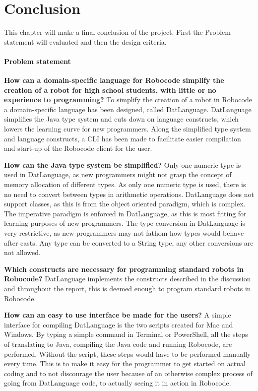 \chapter{Conclusion}
\label{chap:Conclusion}
This chapter will make a final conclusion of the project. First the Problem statement will evaluated and then the design criteria.

\subsubsection{Problem statement}
\textbf{How can a domain-specific language for Robocode simplify the creation of a robot for high school students, with little or no experience to programming?} \newline
To simplify the creation of a robot in Robocode a domain-specific language has been designed, called DatLanguage. DatLanguage simplifies the Java type system and cuts down on language constructs, which lowers the learning curve for new programmers. Along the simplified type system and language constructs, a CLI has been made to facilitate easier compilation and start-up of the Robocode client for the user.

\textbf{How can the Java type system be simplified?} \newline
Only one numeric type is used in DatLanguage, as new programmers might not grasp the concept of memory allocation of different types. As only one numeric type is used, there is no need to convert between types in arithmetic operations. DatLanguage does not support classes, as this is from the object oriented paradigm, which is complex. The imperative paradigm is enforced in DatLanguage, as this is most fitting for learning purposes of new programmers. The type conversion in DatLanguage is very restrictive, as new programmers may not fathom how types would behave after casts. Any type can be converted to a String type, any other conversions are not allowed. 

\textbf{Which constructs are necessary for programming standard robots in Robocode?} \newline
DatLanguage implements the constructs described in the discussion and throughout the report, this is deemed enough to program standard robots in Robocode. 

\textbf{How can an easy to use interface be made for the users?} \newline
A simple interface for compiling DatLanguage is the two scripts created for Mac and Windows. By typing a simple command in Terminal or PowerShell, all the steps of translating to Java, compiling the Java code and running Robocode, are performed. 
Without the script, these steps would have to be performed manually every time.
This is to make it easy for the programmer to get started on actual coding and to not discourage the user because of an otherwise complex process of going from DatLanguage code, to actually seeing it in action in Robocode.

